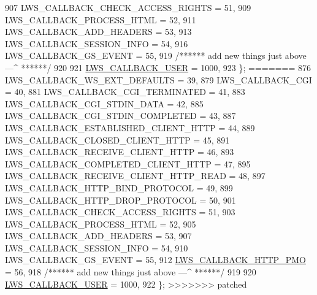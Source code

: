\begin{DoxyCode}
907         LWS\_CALLBACK\_CHECK\_ACCESS\_RIGHTS                        = 51,
909         LWS\_CALLBACK\_PROCESS\_HTML                               = 52,
911         LWS\_CALLBACK\_ADD\_HEADERS                                = 53,
913         LWS\_CALLBACK\_SESSION\_INFO                               = 54,
916         LWS\_CALLBACK\_GS\_EVENT                                   = 55,
919         \textcolor{comment}{/****** add new things just above ---^ ******/}
920 
921         \hyperlink{group__usercb_ggad62860e19975ba4c4af401c3cdb6abf7a982579753e70e59a9ea13ce628ac891a}{LWS\_CALLBACK\_USER} = 1000,
923 \};
=======
876         LWS\_CALLBACK\_WS\_EXT\_DEFAULTS                            = 39,
879         LWS\_CALLBACK\_CGI                                        = 40,
881         LWS\_CALLBACK\_CGI\_TERMINATED                             = 41,
883         LWS\_CALLBACK\_CGI\_STDIN\_DATA                             = 42,
885         LWS\_CALLBACK\_CGI\_STDIN\_COMPLETED                        = 43,
887         LWS\_CALLBACK\_ESTABLISHED\_CLIENT\_HTTP                    = 44,
889         LWS\_CALLBACK\_CLOSED\_CLIENT\_HTTP                         = 45,
891         LWS\_CALLBACK\_RECEIVE\_CLIENT\_HTTP                        = 46,
893         LWS\_CALLBACK\_COMPLETED\_CLIENT\_HTTP                      = 47,
895         LWS\_CALLBACK\_RECEIVE\_CLIENT\_HTTP\_READ                   = 48,
897         LWS\_CALLBACK\_HTTP\_BIND\_PROTOCOL                         = 49,
899         LWS\_CALLBACK\_HTTP\_DROP\_PROTOCOL                         = 50,
901         LWS\_CALLBACK\_CHECK\_ACCESS\_RIGHTS                        = 51,
903         LWS\_CALLBACK\_PROCESS\_HTML                               = 52,
905         LWS\_CALLBACK\_ADD\_HEADERS                                = 53,
907         LWS\_CALLBACK\_SESSION\_INFO                               = 54,
910         LWS\_CALLBACK\_GS\_EVENT                                   = 55,
912         \hyperlink{group__usercb_ggad62860e19975ba4c4af401c3cdb6abf7aa5cc921b7697743017a533822a3d556a}{LWS\_CALLBACK\_HTTP\_PMO}                                      = 56,
918         \textcolor{comment}{/****** add new things just above ---^ ******/}
919 
920         \hyperlink{group__usercb_ggad62860e19975ba4c4af401c3cdb6abf7a982579753e70e59a9ea13ce628ac891a}{LWS\_CALLBACK\_USER} = 1000,
922 \};
>>>>>>> patched
\end{DoxyCode}
